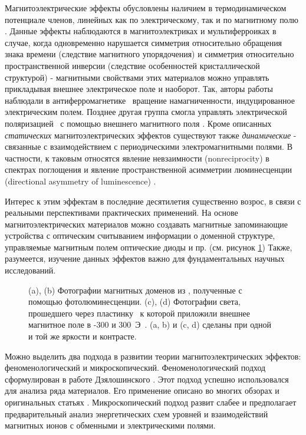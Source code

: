 {\actuality} Магнитоэлектрические эффекты обусловлены наличием в термодинамическом потенциале членов, линейных как по электрическому, так и по магнитному полю \autocite{Landau}. Данные эффекты наблюдаются в магнитоэлектриках и мультиферроиках в случае, когда одновременно нарушается симметрия относительно обращения знака времени (следствие магнитного упорядочения) и симметрия относительно пространственной инверсии (следствие особенностей кристаллической структурой) - магнитными свойствами этих материалов можно управлять прикладывая внешнее электрическое поле и наоборот. Так, авторы работы \autocite{Saito2008ape} наблюдали в антиферромагнетике \cbo\ вращение намагниченности, индуцированное электрическим полем. Позднее другая группа смогла управлять электрической поляризацией \ncbo\ с помощью внешнего магнитного поля \autocite{Khanh2013}. Кроме описанных \emph{статических} магнитоэлектрических эффектов существуют также \emph{динамические} - связанные с взаимодействием с периодическими электромагнитными полями. В частности, к таковым относятся явление невзаимности (nonreciprocity) в спектрах поглощения \autocite{Toyoda2015} и явление пространственной асимметрии люминесценции (directional asymmetry of luminescence) \autocite{Toyoda2016}.  

Интерес к этим эффектам в последние десятилетия существенно возрос, в связи с реальными перспективами практических применений. На основе магнитоэлектрических материалов можно создавать магнитные запоминающие устройства с оптическим считыванием информации о доменной структуре, управляемые магнитным полем оптические диоды и пр. (см. рисунок \cref{fig:applications}) Также, разумеется, изучение данных эффектов важно для фундаментальных научных исследований.

\begin{figure}[ht]
	\caption{(a), (b) Фотографии магнитных доменов из \autocite{Toyoda2016}, полученные с помощью фотолюминесценции. (c), (d) Фотографии света, прошедшего через пластинку \cbo\, к которой приложили внешнее магнитное поле в -300 и 300~Э~\autocite{Saito2008jpsj}. (a, b) и (c, d) сделаны при одной и той же яркости и контрасте.}\label{fig:applications}
\end{figure}

Можно выделить два подхода в развитии теории магнитоэлектрических эффектов: феноменологический и микроскопический. Феноменологический подход сформулирован в работе Дзялошинского \autocite{Dzyaloshinskii1959}. Этот подход успешно использовался для анализа ряда материалов. Его применение описано во многих обзорах и оригинальных статьях \autocite{Zvezdin2008, Pyatakov2012, Popkov2016}. Микроскопический подход развит слабее и предполагает предварительный анализ энергетических схем уровней и взаимодействий магнитных ионов с обменными и электрическими полями.

